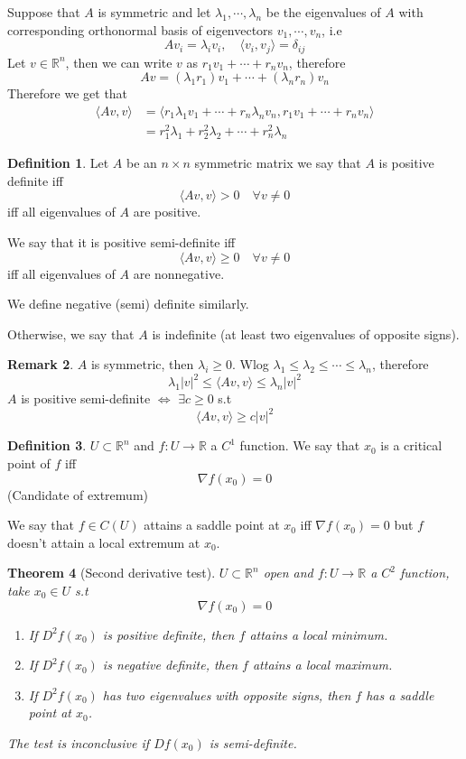 \documentclass[11pt,a4paper]{article}
\theoremstyle{definition}
\newtheorem{definition}{Definition}[section]
\newtheorem{remark}[definition]{Remark}
\theoremstyle{plain}
\newtheorem{theorem}[definition]{Theorem}
\theoremstyle{remark}
\newcommand{\R}{\mathbb{R}}
\newcommand{\angles}[1]{\langle #1 \rangle}
\begin{document}
Suppose that $A$ is symmetric and let $\lambda_1, \cdots, \lambda_n$ be the eigenvalues of $A$ with corresponding orthonormal basis 
of eigenvectors $v_1, \cdots, v_n$, i.e 
$$A v_i = \lambda_i v_i, \quad \angles{v_i, v_j} = \delta_{ij}$$
Let $v \in \R^n$, then we can write $v$ as $r_1 v_1 + \cdots + r_n v_n$, therefore 
$$Av = (\lambda_1 r_1) v_1 + \cdots + (\lambda_n r_n) v_n$$
Therefore we get that 
\begin{align*}
    \angles{Av, v} &= \angles{r_1 \lambda_1 v_1 + \cdots + r_n \lambda_n v_n, r_1 v_1 + \cdots + r_n v_n} \\
    &= r_1^2 \lambda_1 + r_2^2 \lambda_2 + \cdots + r_n^2 \lambda_n
\end{align*}

\begin{definition}
    Let $A$ be an $n\times n$ symmetric matrix we say that $A$ is positive definite iff 
    $$\angles{Av, v} > 0 \quad \forall v \ne 0$$
    iff all eigenvalues of $A$ are positive.

    We say that it is positive semi-definite iff 
    $$\angles{Av, v} \ge 0 \quad \forall v \ne 0$$
    iff all eigenvalues of $A$ are nonnegative. 

    We define negative (semi) definite similarly. 

    Otherwise, we say that $A$ is indefinite (at least two eigenvalues of opposite signs). 
\end{definition}

\begin{remark}
    $A$ is symmetric, then $\lambda_i \ge 0$. Wlog $\lambda_1 \le \lambda_2 \le \cdots \le \lambda_n$, therefore 
    $$\lambda_1 |v|^2 \le \angles{Av,v} \le \lambda_n |v|^2$$
    $A$ is positive semi-definite $\iff$ $\exists c \ge 0$ s.t 
    $$\angles{Av,v} \ge c |v|^2$$  
\end{remark}

\begin{definition}
    $U \subset \R^n$ and $f \colon U \to \R$ a $C^1$ function. We say that $x_0$ is a critical point of $f$ iff 
    $$\nabla f(x_0) = 0$$
    (Candidate of extremum)

    We say that $f \in C(U)$ attains a saddle point at $x_0$ iff $\nabla f(x_0) = 0$ but $f$ doesn't attain a local extremum at $x_0$.  
\end{definition}

\begin{theorem}[Second derivative test]
    $U \subset \R^n$ open and $f \colon U \to \R$ a $C^2$ function, take $x_0 \in U$ s.t 
    $$\nabla f(x_0) = 0$$
    \begin{enumerate}
        \item If $D^2f(x_0)$ is positive definite, then $f$ attains a local minimum.
        \item If $D^2f(x_0)$ is negative definite, then $f$ attains a local maximum.
        \item If $D^2f(x_0)$ has two eigenvalues with opposite signs, then $f$ has a saddle point at $x_0$.
    \end{enumerate}
    The test is inconclusive if $Df(x_0)$ is semi-definite.
\end{theorem}
\end{document}
